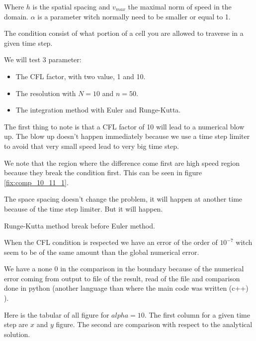 Where $h$ is the spatial spacing and $v_{max}$ the maximal norm of speed in the domain.
$\alpha$ is a parameter witch normally need to be smaller or equal to 1.

The condition consist of what portion of a cell you are allowed to traverse in a given time step.

We will test 3 parameter:
\begin{itemize}
	\item The CFL factor, with two value, 1 and 10.
	\item The resolution with $N=10$ and $n=50$.
	\item The integration method with Euler and Runge-Kutta.
\end{itemize}
 
The first thing to note is that a CFL factor of 10 will lead to a numerical blow up.
The blow up doesn't happen immediately because we use a time step limiter to avoid that very small speed lead to very big time step.

We note that the region where the difference come first are high speed region because they break the condition first.
This can be seen in figure \ref{fix:comp_10_11_1}.

The space spacing doesn't change the problem, it will happen at another time because of the time step limiter.
But it will happen.

Runge-Kutta method break before Euler method.

When the CFL condition is respected we have an error of the order of $10^{-7}$ witch seem to be of the same amount than the global numerical error.

We have a none 0 in the comparison in the boundary because of the numerical error coming from output to file of the result,
read of the file and comparison done in python (another language than where the main code was written (c++) ).

Here is the tabular of all figure for $alpha=10$. The first column for a given time step are $x$ and $y$ figure.
The second are comparison with respect to the analytical solution.

